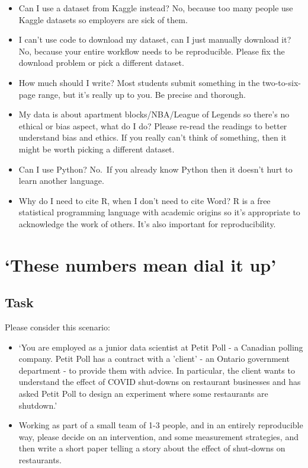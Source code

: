 \documentclass[
]{book}
\providecommand{\tightlist}{%
  \setlength{\itemsep}{0pt}\setlength{\parskip}{0pt}}
\begin{document}
\begin{itemize}
\tightlist
\item
  Can I use a dataset from Kaggle instead? No, because too many people use Kaggle datasets so employers are sick of them.
\item
  I can't use code to download my dataset, can I just manually download it? No, because your entire workflow needs to be reproducible. Please fix the download problem or pick a different dataset.
\item
  How much should I write? Most students submit something in the two-to-six-page range, but it's really up to you. Be precise and thorough.
\item
  My data is about apartment blocks/NBA/League of Legends so there's no ethical or bias aspect, what do I do? Please re-read the readings to better understand bias and ethics. If you really can't think of something, then it might be worth picking a different dataset.
\item
  Can I use Python? No.~If you already know Python then it doesn't hurt to learn another language.
\item
  Why do I need to cite R, when I don't need to cite Word? R is a free statistical programming language with academic origins so it's appropriate to acknowledge the work of others. It's also important for reproducibility.
\end{itemize}

\hypertarget{these-numbers-mean-dial-it-up}{%
\section{`These numbers mean dial it up'}\label{these-numbers-mean-dial-it-up}}

\hypertarget{task-1}{%
\subsection{Task}\label{task-1}}

Please consider this scenario:

\begin{itemize}
\tightlist
\item
  `You are employed as a junior data scientist at Petit Poll - a Canadian polling company. Petit Poll has a contract with a 'client' - an Ontario government department - to provide them with advice. In particular, the client wants to understand the effect of COVID shut-downs on restaurant businesses and has asked Petit Poll to design an experiment where some restaurants are shutdown.'
\item
  Working as part of a small team of 1-3 people, and in an entirely reproducible way, please decide on an intervention, and some measurement strategies, and then write a short paper telling a story about the effect of shut-downs on restaurants.
\end{itemize}
\end{document}
